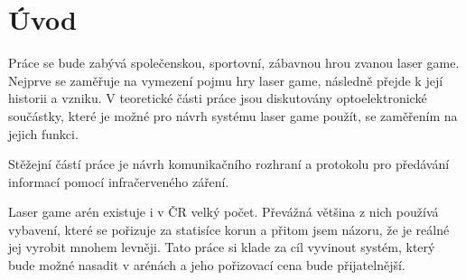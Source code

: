 \chapter*{Úvod}
{}


Práce se bude zabývá společenskou, sportovní, zábavnou hrou zvanou laser game. Nejprve se zaměřuje na vymezení pojmu hry laser game, následně přejde k její historii a vzniku. V teoretické části práce jsou diskutovány optoelektronické součástky, které je možné pro návrh systému laser game použít, se zaměřením na jejich funkci.

Stěžejní částí práce je návrh komunikačního rozhraní a protokolu pro předávání informací pomocí infračerveného záření.

Laser game arén existuje i v ČR velký počet. Převážná většina z nich používá vybavení, které se pořizuje za statisíce korun a přitom jsem názoru, že je reálné jej vyrobit mnohem levněji. Tato práce si klade za cíl vyvinout systém, který bude možné nasadit v arénách a jeho pořizovací cena bude přijatelnější.
